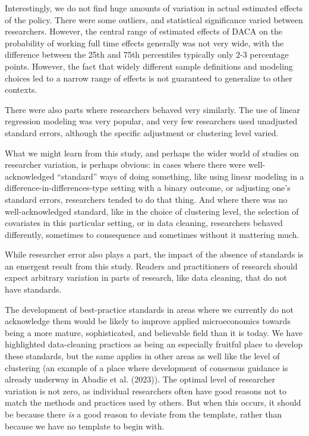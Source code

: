 \documentclass[
  letterpaper,
  DIV=11,
  numbers=noendperiod]{scrartcl}
\begin{document}
Interestingly, we do not find huge amounts of variation in actual
estimated effects of the policy. There were some outliers, and
statistical significance varied between researchers. However, the
central range of estimated effects of DACA on the probability of working
full time effects generally was not very wide, with the difference
between the 25th and 75th percentiles typically only 2-3 percentage
points. However, the fact that widely different sample definitions and
modeling choices led to a narrow range of effects is not guaranteed to
generalize to other contexts.

There were also parts where researchers behaved very similarly. The use
of linear regression modeling was very popular, and very few researchers
used unadjusted standard errors, although the specific adjustment or
clustering level varied.

What we might learn from this study, and perhaps the wider world of
studies on researcher variation, is perhaps obvious: in cases where
there were well-acknowledged ``standard'' ways of doing something, like
using linear modeling in a difference-in-differences-type setting with a
binary outcome, or adjusting one's standard errors, researchers tended
to do that thing. And where there was no well-acknowledged standard,
like in the choice of clustering level, the selection of covariates in
this particular setting, or in data cleaning, researchers behaved
differently, sometimes to consequence and sometimes without it mattering
much.

While researcher error also plays a part, the impact of the absence of
standards is an emergent result from this study. Readers and
practitioners of research should expect arbitrary variation in parts of
research, like data cleaning, that do not have standards.

The development of best-practice standards in areas where we currently
do not acknowledge them would be likely to improve applied
microeconomics towards being a more mature, sophisticated, and
believable field than it is today. We have highlighted data-cleaning
practices as being an especially fruitful place to develop these
standards, but the same applies in other areas as well like the level of
clustering (an example of a place where development of consensus
guidance is already underway in Abadie et al. (2023)). The optimal level
of researcher variation is not zero, as individual researchers often
have good reasons not to match the methods and practices used by others.
But when this occurs, it should be because there \emph{is} a good reason
to deviate from the template, rather than because we have no template to
begin with.
\end{document}
